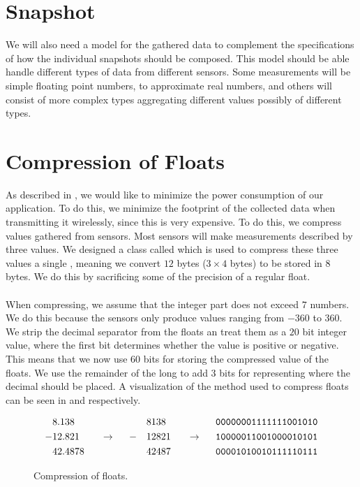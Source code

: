 
\section{Snapshot}
\label{sec:snapshot}

We will also need a model for the gathered data to complement the specifications of how the individual snapshots should be composed. This model should be able handle different types of data from different sensors. Some measurements will be simple floating point numbers, to approximate real numbers, and others will consist of more complex types aggregating different values possibly of different types.  

\section{Compression of Floats}
As described in , we would like to minimize the power consumption of our application. To do this, we minimize the footprint of the collected data when transmitting it wirelessly, since this is very expensive. To do this, we compress values gathered from sensors. Most sensors will make measurements described by three  values. We designed a class called  which is used to compress these three values a single , meaning we convert $12$ bytes ($3 \times 4$ bytes) to be stored in $8$ bytes. We do this by sacrificing some of the precision of a regular float.
\\\\
When compressing, we assume that the integer part does not exceed $7$ numbers. We do this because the sensors only produce values ranging from $-360$ to $360$. We strip the decimal separator from the floats an treat them as a $20$ bit integer value, where the first bit determines whether the value is positive or negative. This means that we now use $60$ bits for storing the compressed value of the floats. We use the remainder of the long to add 3 bits for representing where the decimal should be placed. A visualization of the method used to compress floats can be seen in  and  respectively.
\begin{figure}[!htbp]
    \begin{alignat*}{6}
       &8.138   &&                   &&   && 8138  &&                   && \text{\texttt{00000001111111001010}} \\
      -&12.821  && ~~ \rightarrow ~~ && - && 12821 && ~~ \rightarrow ~~ && \text{\texttt{10000011001000010101}} \\
       &42.4878 &&                   &&   && 42487 &&                   && \text{\texttt{00001010010111110111}} 
    \end{alignat*}
    \caption{Compression of floats.}
    \label{fig:float_triple_convert}
\end{figure}

